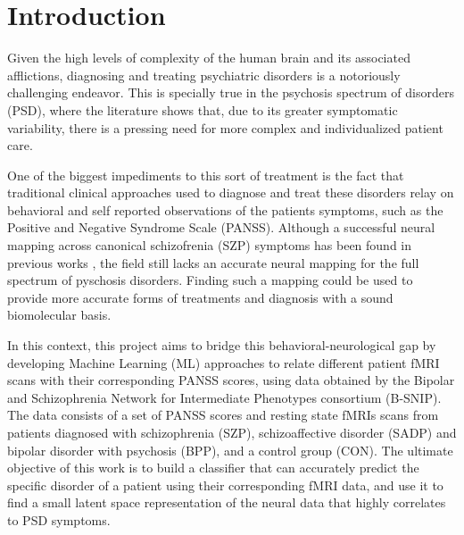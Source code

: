 \documentclass[fleqn,moreauthors,10pt]{ds_report}
\affiliation{\textit{Advisors: Prof. Dr. Jure Demšar}}
\begin{document}
\flushbottom 

\maketitle 

\thispagestyle{empty} 


\section*{Introduction}

    Given the high levels of complexity of the human brain and its associated afflictions, diagnosing and treating psychiatric disorders is a notoriously challenging endeavor. This is specially true in the psychosis spectrum of disorders (PSD), where the literature shows that, due to its greater symptomatic variability, there is a pressing need for more complex and individualized patient care.

    One of the biggest impediments to this sort of treatment is the fact that traditional clinical approaches used to diagnose and treat these disorders relay on behavioral and self reported observations of the patients symptoms, such as the Positive and Negative Syndrome Scale (PANSS). Although a successful neural mapping across canonical schizofrenia (SZP) symptoms has been found in previous works \cite{Chen2020}, the field still lacks an accurate neural mapping for the full spectrum of pyschosis disorders. Finding such a mapping could be used to provide more accurate forms of treatments and diagnosis with a sound biomolecular basis.

    In this context, this project aims to bridge this behavioral-neurological gap by developing Machine Learning (ML) approaches to relate different patient fMRI scans with their corresponding PANSS scores, using data obtained by the Bipolar and Schizophrenia Network for Intermediate Phenotypes consortium (B-SNIP)\cite{Clementz2016}. The data consists of a set of PANSS scores and resting state fMRIs scans from patients diagnosed with schizophrenia (SZP), schizoaffective disorder (SADP) and bipolar disorder with psychosis (BPP), and a control group (CON). The ultimate objective of this work is to build a classifier that can accurately predict the specific disorder of a patient using their corresponding fMRI data, and use it to find a small latent space representation of the neural data that highly correlates to PSD symptoms.
    
\end{document}
